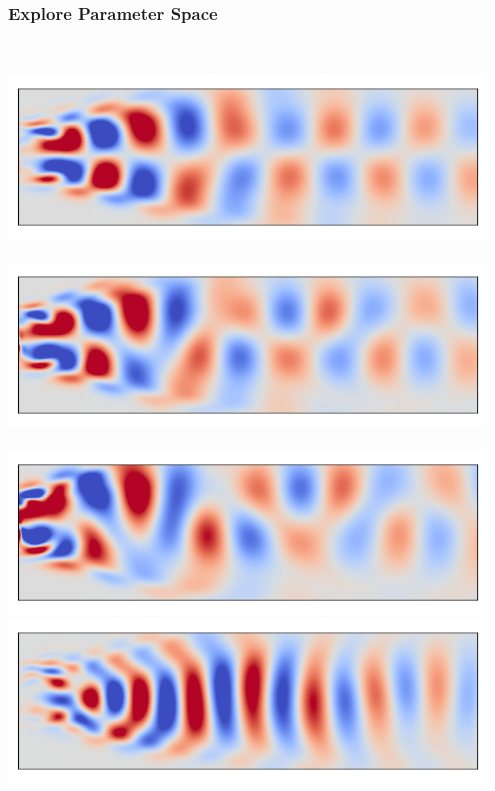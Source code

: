 \documentclass[9pt]{beamer}
\begin{document}
\begin{frame}
\frametitle{Explore Parameter Space}
\label{sec-3-4}

\begin{columns}[c]
\centering
{}\\\vspace{-0.07cm}\includegraphics[width=0.95\textwidth]{POD2CompareInterp1} \\
\\\vspace{-0.07cm}\includegraphics[width=0.95\textwidth]{POD2CompareInterp2} \\
\\\vspace{-0.07cm}\includegraphics[width=0.95\textwidth]{POD2CompareInterp4}
\centering
{}\\\vspace{-0.07cm}\includegraphics[width=0.95\textwidth]{POD4CompareInterp1} \\

\end{columns}
\end{frame}
\end{document}
